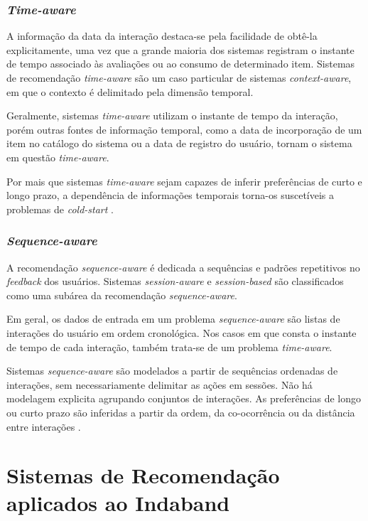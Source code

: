 \subsubsection{\textit{Time-aware}}

A informação da data da interação destaca-se
pela facilidade de obtê-la explicitamente, uma vez que a grande maioria dos
sistemas registram o instante de tempo associado às avaliações ou ao consumo de
determinado item. Sistemas de recomendação \textit{time-aware} são um caso
particular de sistemas \textit{context-aware}, em que o contexto é delimitado
pela dimensão temporal.

Geralmente, sistemas \textit{time-aware} utilizam o instante de tempo da
interação, porém outras fontes de informação temporal, como a data de
incorporação de um item no catálogo do sistema ou a data de registro do usuário,
tornam o sistema em questão \textit{time-aware}.

Por mais que sistemas \textit{time-aware} sejam capazes de inferir preferências
de curto e longo prazo, a dependência de informações temporais torna-os
suscetíveis a problemas de \textit{cold-start} \cite{rec_sys_handbook_2022_multi}.

\subsubsection{\textit{Sequence-aware}}
A recomendação \textit{sequence-aware} é dedicada a sequências e padrões
repetitivos no \textit{feedback} dos usuários. Sistemas \textit{session-aware} e
\textit{session-based} são classificados como uma subárea da recomendação
\textit{sequence-aware}.

Em geral, os dados de entrada em um problema \textit{sequence-aware} são listas
de interações do usuário em ordem cronológica. Nos casos em que consta o instante
de tempo de cada interação, também trata-se de um problema \textit{time-aware}.

Sistemas \textit{sequence-aware} são modelados a partir de sequências ordenadas
de interações, sem necessariamente delimitar as ações em sessões. Não há
modelagem explicita agrupando conjuntos de interações. As preferências de longo
ou curto prazo são inferidas a partir da ordem, da co-ocorrência ou da distância
entre interações \cite{sessionbaseddp, quadrana2018sequence}.


\section{Sistemas de Recomendação aplicados ao Indaband}

